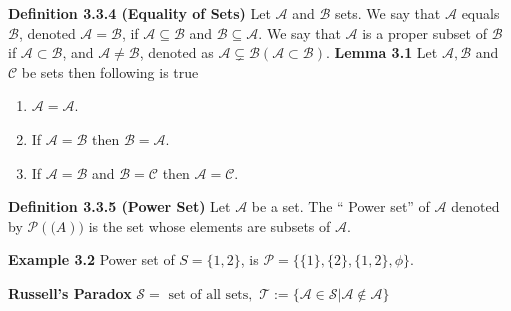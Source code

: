 \documentclass[a4paper,10pt]{article}
\begin{document}
\textbf{Definition 3.3.4 (Equality of Sets)} Let $\mathcal{A}$ and $\mathcal{B}$ sets. We say that $\mathcal{A}$ equals $\mathcal{B}$, denoted $\mathcal{A}=\mathcal{B}$, if $\mathcal{A}\subseteq \mathcal{B}$ and $\mathcal{B}\subseteq \mathcal{A}$. We say that $\mathcal{A}$ is a proper subset of $\mathcal{B}$ if $\mathcal{A}\subset \mathcal{B}$, and $\mathcal{A}\neq \mathcal{B}$, denoted as $\mathcal{A}\varsubsetneq \mathcal{B} (\mathcal{A}\subset \mathcal{B})$. 
\textbf{Lemma 3.1} Let $\mathcal{A},\mathcal{B}$ and $\mathcal{C}$ be sets then following is true
\begin{enumerate}
 \item $\mathcal{A}= \mathcal{A}$.
 \item If $\mathcal{A}= \mathcal{B}$ then $\mathcal{B}= \mathcal{A}$.
 \item If $\mathcal{A}= \mathcal{B}$ and $\mathcal{B}= \mathcal{C}$ then $\mathcal{A}= \mathcal{C}$.
\end{enumerate}
\textbf{Definition 3.3.5 (Power Set)} Let $\mathcal{A}$ be a set. The `` Power set'' of $\mathcal{A}$ denoted by $\mathcal{P}(\mathcal(A))$ is the set whose elements are subsets of $\mathcal{A}$.

\textbf{Example 3.2} Power set of $S=\{1,2\}$, is $\mathcal{P}=\{\{1\},\{2\},\{1,2\},\phi\}$.

\textbf{Russell's Paradox}
$\mathcal{S} = \text{ set of all sets},$ $\mathcal{T}:=\{\mathcal{A}\in\mathcal{S}|\mathcal{A}\not\in\mathcal{A} \}$
\end{document}
